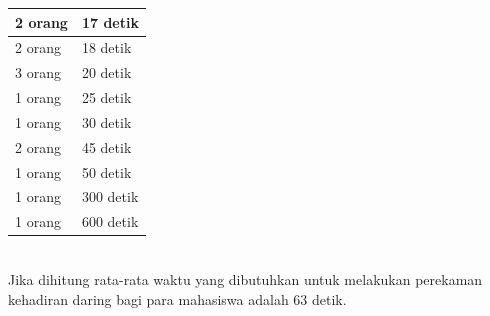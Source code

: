 \begin{enumerate}
\begin{tabular}{|p{4cm} |p{7cm}|}
		2 orang &  17 detik\\ \hline 
		2 orang &  18 detik\\ \hline 
		3 orang &  20 detik\\ \hline
		1 orang &  25 detik\\ \hline 
		1 orang &  30 detik\\ \hline 
		2 orang &  45 detik\\ \hline
		1 orang &  50 detik\\ \hline 
		1 orang &  300 detik\\ \hline 
		1 orang &  600 detik\\ \hline
	\end{tabular}\\ 

	Jika dihitung rata-rata waktu yang dibutuhkan untuk melakukan perekaman kehadiran daring bagi para mahasiswa adalah 63 detik.
	

\end{enumerate}
